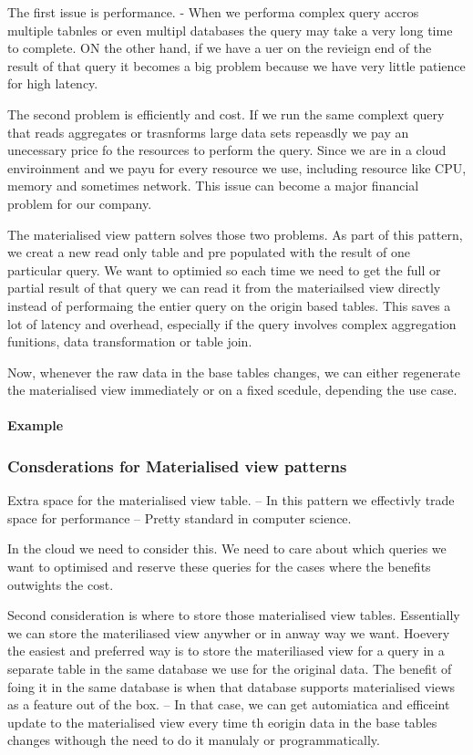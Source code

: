 \documentclass[a4paper, 11pt]{book}
\begin{document}
{    The first issue is performance.
    - When we performa complex query accros multiple tabnles or even multipl databases the query may take a very long time to complete.
    ON the other hand, if we have a uer on the revieign end of the result of that query it becomes a big problem because we have very little patience for high latency.

    The second problem is efficiently and cost.
    If we run the same complext query that reads aggregates or trasnforms large data sets repeasdly we pay an unecessary price fo the resources to perform the query.
    Since we are in a cloud enviroinment and we payu for every resource we use, including resource like CPU, memory and sometimes network. This issue can become a major financial problem for our company.

    The materialised view pattern solves those two problems.
    As part of this pattern, we creat a new read only table and pre populated with the result of one particular query.
    We want to optimied so each time we need to get the full or partial result of that query we can read it from the materiailsed view directly instead of performaing the entier query on the origin based tables.
    This saves a lot of latency and overhead, especially if the query involves complex aggregation funitions, data transformation or table join.

    Now, whenever the raw data in the base tables changes, we can either regenerate the materialised view immediately or on a fixed scedule, depending the use case.

    \paragraph{Example}

    \subsubsection{Consderations for Materialised view patterns}
    Extra space for the materialised view table.
    -- In this pattern we effectivly trade space for performance
    -- Pretty standard in computer science.

    In the cloud we need to consider this.
    We need to care about which queries we want to optimised and reserve these queries for the cases where the benefits outwights the cost.

    Second consideration is where to store those materialised view tables.
    Essentially we can store the materiliased view anywher or in anway way we want.
    Hoevery the easiest and preferred way is to store the materiliased view for a query in a separate table in the same database we use for the original data.
    The benefit of foing it in the same database is when that database supports materialised views as a feature out of the box.
    -- In that case, we can get automiatica and efficeint update to the materialised view every time th eorigin data in the base tables changes withough the need to do it manulaly or programmatically.

}
\end{document}
